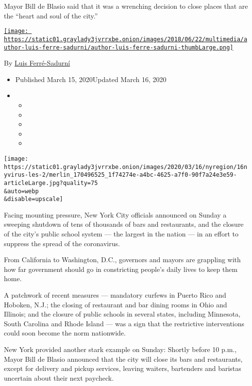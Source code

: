 Mayor Bill de Blasio said that it was a wrenching decision to close
places that are the ``heart and soul of the city.''

\href{https://www.nytimes3xbfgragh.onion/by/luis-ferre-sadurni}{\texttt{[image: https://static01.graylady3jvrrxbe.onion/images/2018/06/22/multimedia/author-luis-ferre-sadurni/author-luis-ferre-sadurni-thumbLarge.png]}}

By \href{https://www.nytimes3xbfgragh.onion/by/luis-ferre-sadurni}{Luis
Ferré-Sadurní}

\begin{itemize}
\item
  Published March 15, 2020Updated March 16, 2020
\item
  \begin{itemize}
  \item
  \item
  \item
  \item
  \item
  \end{itemize}
\end{itemize}

\texttt{[image: https://static01.graylady3jvrrxbe.onion/images/2020/03/16/nyregion/16nyvirus-les-2/merlin\_170496525\_1f74274e-a4bc-4625-a7f0-90f7a24e3e59-articleLarge.jpg?quality=75\\\&auto=webp\\\&disable=upscale]}

Facing mounting pressure, New York City officials announced on Sunday a
sweeping shutdown of tens of thousands of bars and restaurants, and the
closure of the city's public school system --- the largest in the nation
--- in an effort to suppress the spread of the coronavirus.

From California to Washington, D.C., governors and mayors are grappling
with how far government should go in constricting people's daily lives
to keep them home.

A patchwork of recent measures --- mandatory curfews in Puerto Rico and
Hoboken, N.J.; the closing of restaurant and bar dining rooms in Ohio
and Illinois; and the closure of public schools in several states,
including Minnesota, South Carolina and Rhode Island --- was a sign that
the restrictive interventions could soon become the norm nationwide.

New York provided another stark example on Sunday: Shortly before 10
p.m., Mayor Bill de Blasio announced that the city will close its bars
and restaurants, except for delivery and pickup services, leaving
waiters, bartenders and baristas uncertain about their next paycheck.

